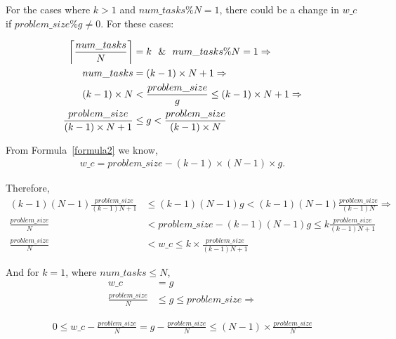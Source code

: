 For the cases where $k>1$ and $num\_{tasks}\%{N}={1}$, there could be a  change in $w\_c$ if $problem\_{size}\%{g}\neq{0}$. For these cases:


\begin{equation}\label{formula15}
\begin{aligned}
\left \lceil{\frac{num\_{tasks}}{N}}\right \rceil&=k \text{\:\:\:}\&\text{\:\:\:} num\_{tasks}\%{N}={1}\Rightarrow\\
num\_{tasks}&=(k-1)\times{N}+1\Rightarrow\\
(k-1)\times{N}&<{\frac{problem\_{size}}{g}}\leq(k-1)\times{N}+1\Rightarrow\\
\frac{problem\_{size}}{(k-1)\times{N}+1}&\leq{g}<\frac{problem\_{size}}{(k-1)\times{N}}
\end{aligned}
\end{equation}

From Formula~\ref{formula2} we know,
\begin{equation}\label{formula17}
\begin{aligned}
w\_c={problem\_{size}}-(k-1)\times(N-1)\times{g}.
\end{aligned}
\end{equation}

Therefore,
\begin{equation}\label{formula18}
\begin{aligned}
(k-1)(N-1)\frac{problem\_{size}}{(k-1){N}+1}&\leq{(k-1)(N-1){g}}<(k-1)(N-1)\frac{problem\_{size}}{(k-1){N}}\Rightarrow\\
{\frac{problem\_{size}}{N}}&<{problem\_{size}-{(k-1)(N-1){g}}}\leq{k\frac{problem\_{size}}{(k-1){N}+1}}\\
{\frac{problem\_{size}}{N}}&<{w\_{c}}\leq{k\times\frac{problem\_{size}}{(k-1){N}+1}}
\end{aligned}
\end{equation}

And for $k=1$, where $num\_{tasks}\leq{N}$,
\begin{align*}\label{formula12}
w\_c&=g\\
\frac{problem\_{size}}{N}&\leq{g}\leq{problem\_{size}}\Rightarrow
\end{align*}

\begin{equation}\label{formula14}
\begin{aligned}
0\leq{w\_c-\frac{problem\_{size}}{N}}={g-\frac{problem\_{size}}{N}}\leq(N-1)\times{\frac{problem\_{size}}{N}}\\
\end{aligned}
\end{equation}


